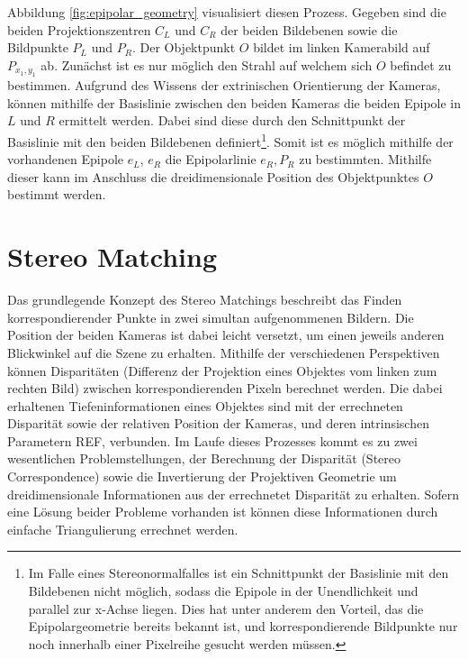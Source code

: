Abbildung \ref{fig:epipolar_geometry} visualisiert diesen Prozess. Gegeben sind die beiden Projektionszentren $C_L$ und $C_R$ der beiden Bildebenen sowie die Bildpunkte $P_L$ und $P_R$. Der Objektpunkt $O$ bildet im linken Kamerabild auf $P_{x_1,y_1}$ ab. Zunächst ist es nur möglich den Strahl auf welchem sich $O$ befindet zu bestimmen. Aufgrund des Wissens der extrinischen Orientierung der Kameras, können mithilfe der Basislinie zwischen den beiden Kameras die beiden Epipole in $L$ und $R$ ermittelt werden. Dabei sind diese durch den Schnittpunkt der Basislinie mit den beiden Bildebenen definiert\footnote{Im Falle eines Stereonormalfalles ist ein Schnittpunkt der Basislinie mit den Bildebenen nicht möglich, sodass die Epipole in der Unendlichkeit und parallel zur x-Achse liegen. Dies hat unter anderem den Vorteil, das die Epipolargeometrie bereits bekannt ist, und korrespondierende Bildpunkte nur noch innerhalb einer Pixelreihe gesucht werden müssen.}. Somit ist es möglich mithilfe der vorhandenen Epipole $e_L$, $e_R$ die Epipolarlinie $e_R,P_R$ zu bestimmten. Mithilfe dieser kann im Anschluss die dreidimensionale Position des Objektpunktes $O$ bestimmt werden.

\section{Stereo Matching}
\label{sec:stereo_matching}
Das grundlegende Konzept des Stereo Matchings beschreibt das Finden korrespondierender Punkte in zwei simultan aufgenommenen Bildern. Die Position der beiden Kameras ist dabei leicht versetzt, um einen jeweils anderen Blickwinkel auf die Szene zu erhalten. Mithilfe der verschiedenen Perspektiven können Disparitäten (Differenz der Projektion eines Objektes vom linken zum rechten Bild) zwischen korrespondierenden Pixeln berechnet werden. Die dabei erhaltenen Tiefeninformationen eines Objektes sind mit der errechneten Disparität sowie der relativen Position der Kameras, und deren intrinsischen Parametern REF, verbunden. Im Laufe dieses Prozesses kommt es zu zwei wesentlichen Problemstellungen, der Berechnung der Disparität (Stereo Correspondence) sowie die Invertierung der Projektiven Geometrie um dreidimensionale Informationen aus der errechnetet Disparität zu erhalten. Sofern eine Lösung beider Probleme vorhanden ist können diese Informationen durch einfache Triangulierung errechnet werden.



